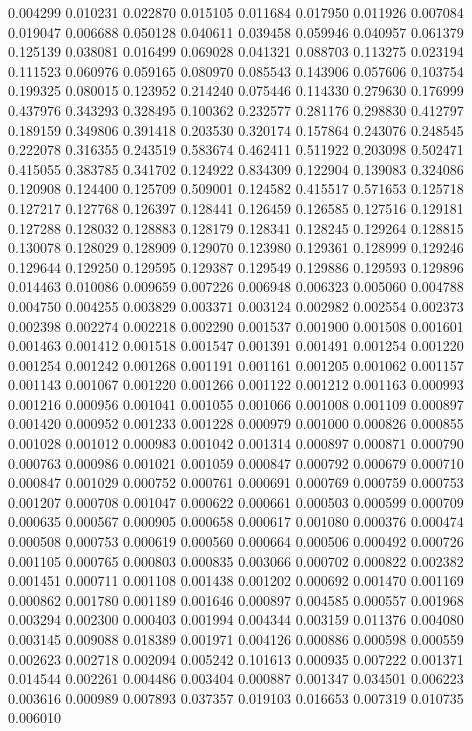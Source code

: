 0.004299
0.010231
0.022870
0.015105
0.011684
0.017950
0.011926
0.007084
0.019047
0.006688
0.050128
0.040611
0.039458
0.059946
0.040957
0.061379
0.125139
0.038081
0.016499
0.069028
0.041321
0.088703
0.113275
0.023194
0.111523
0.060976
0.059165
0.080970
0.085543
0.143906
0.057606
0.103754
0.199325
0.080015
0.123952
0.214240
0.075446
0.114330
0.279630
0.176999
0.437976
0.343293
0.328495
0.100362
0.232577
0.281176
0.298830
0.412797
0.189159
0.349806
0.391418
0.203530
0.320174
0.157864
0.243076
0.248545
0.222078
0.316355
0.243519
0.583674
0.462411
0.511922
0.203098
0.502471
0.415055
0.383785
0.341702
0.124922
0.834309
0.122904
0.139083
0.324086
0.120908
0.124400
0.125709
0.509001
0.124582
0.415517
0.571653
0.125718
0.127217
0.127768
0.126397
0.128441
0.126459
0.126585
0.127516
0.129181
0.127288
0.128032
0.128883
0.128179
0.128341
0.128245
0.129264
0.128815
0.130078
0.128029
0.128909
0.129070
0.123980
0.129361
0.128999
0.129246
0.129644
0.129250
0.129595
0.129387
0.129549
0.129886
0.129593
0.129896
0.014463
0.010086
0.009659
0.007226
0.006948
0.006323
0.005060
0.004788
0.004750
0.004255
0.003829
0.003371
0.003124
0.002982
0.002554
0.002373
0.002398
0.002274
0.002218
0.002290
0.001537
0.001900
0.001508
0.001601
0.001463
0.001412
0.001518
0.001547
0.001391
0.001491
0.001254
0.001220
0.001254
0.001242
0.001268
0.001191
0.001161
0.001205
0.001062
0.001157
0.001143
0.001067
0.001220
0.001266
0.001122
0.001212
0.001163
0.000993
0.001216
0.000956
0.001041
0.001055
0.001066
0.001008
0.001109
0.000897
0.001420
0.000952
0.001233
0.001228
0.000979
0.001000
0.000826
0.000855
0.001028
0.001012
0.000983
0.001042
0.001314
0.000897
0.000871
0.000790
0.000763
0.000986
0.001021
0.001059
0.000847
0.000792
0.000679
0.000710
0.000847
0.001029
0.000752
0.000761
0.000691
0.000769
0.000759
0.000753
0.001207
0.000708
0.001047
0.000622
0.000661
0.000503
0.000599
0.000709
0.000635
0.000567
0.000905
0.000658
0.000617
0.001080
0.000376
0.000474
0.000508
0.000753
0.000619
0.000560
0.000664
0.000506
0.000492
0.000726
0.001105
0.000765
0.000803
0.000835
0.003066
0.000702
0.000822
0.002382
0.001451
0.000711
0.001108
0.001438
0.001202
0.000692
0.001470
0.001169
0.000862
0.001780
0.001189
0.001646
0.000897
0.004585
0.000557
0.001968
0.003294
0.002300
0.000403
0.001994
0.004344
0.003159
0.011376
0.004080
0.003145
0.009088
0.018389
0.001971
0.004126
0.000886
0.000598
0.000559
0.002623
0.002718
0.002094
0.005242
0.101613
0.000935
0.007222
0.001371
0.014544
0.002261
0.004486
0.003404
0.000887
0.001347
0.034501
0.006223
0.003616
0.000989
0.007893
0.037357
0.019103
0.016653
0.007319
0.010735
0.006010

